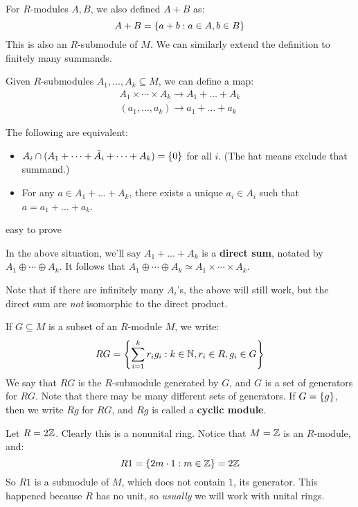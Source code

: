 For $ R $-modules $ A, B $, we also defined $ A + B $ as:
\begin{equation*}
    A + B = \left\{{a + b : a \in A, b \in B}\right\}
\end{equation*}
This is also an $ R $-submodule of $ M $.
We can similarly extend the definition to finitely many summands.

Given $ R $-submodules $ A_{1}, \dots, A_{k} \subseteq M $, we can define a map:
\begin{gather*}
    A_{1} \times \cdots \times A_{k} \rightarrow A_{1} + \dots + A_{k} \\
    (a_{1}, \dots, a_{k}) \rightarrow a_{1} + \dots + a_{k}
\end{gather*}

\begin{thm}
    The following are equivalent:
    \begin{itemize}
        \item $ A_{i} \cap (A_{1} + \dots + \hat{A_{i}} + \dots + A_{k}) = \left\{{0}\right\} $ for all $ i $.
            (The hat means exclude that summand.)
        \item For any $ a \in A_{1} + \dots + A_{k} $, there exists a unique $ a_{i} \in A_{i} $
            such that $ a = a_{1}+\dots+a_{k} $.
    \end{itemize}
\end{thm}
\begin{pf}
    easy to prove
\end{pf}
In the above situation, we'll say $ A_{1} + \dots + A_{k} $ is a \textbf{direct sum},
notated by $ A_{1} \oplus \cdots \oplus A_{k} $.
It follows that $ A_{1} \oplus \cdots \oplus A_{k} \simeq A_{1} \times \cdots \times A_{k} $.

Note that if there are infinitely many $ A_{i} $'s, the above will still work, but the direct sum
are \textit{not} isomorphic to the direct product.

If $ G \subseteq M $ is a subset of an $ R $-module $ M $, we write:
\begin{equation*}
    RG = \left\{{\sum_{i=1}^{k}r_{i}g_{i} : k \in \mathbb{N}, r_{i} \in R, g_{i} \in G}\right\}
\end{equation*}
We say that $ RG $ is the $ R $-submodule generated by $ G $, and $ G $ is a set of generators
for $ RG $. Note that there may be many different sets of generators.
If $ G = \left\{{g}\right\} $, then we write $ Rg $ for $ RG $, and $ Rg $ is called a \textbf{cyclic module}.

\begin{xmp}[source=Primary Source Material]
    Let $ R = 2\mathbb{Z} $. Clearly this is a nonunital ring. \vsp
    Notice that $ M = \mathbb{Z} $ is an $ R $-module, and:
    \begin{equation*}
        R1 = \left\{{2m \cdot 1 : m \in \mathbb{Z}}\right\} = 2\mathbb{Z}
    \end{equation*}
    So $ R1 $ is a submodule of $ M $, which does not contain $ 1 $, its generator.
    This happened because $ R $ has no unit, so \textit{usually} we will work with unital rings.
\end{xmp}

